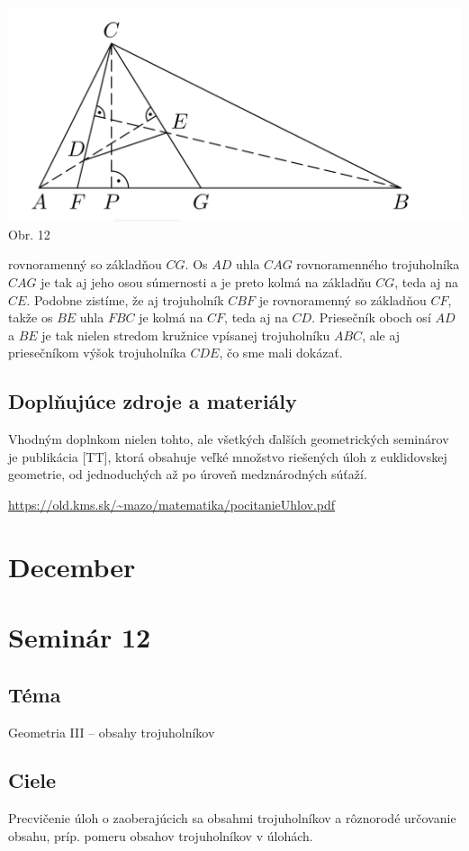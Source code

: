 \documentclass[11pt,a4paper,oneside,final]{book}
\begin{document}
\begin{center}
\includegraphics{58K22}\\

Obr. 12
\end{center}
rovnoramenný so základňou $CG$. Os $AD$ uhla $CAG$ rovnoramenného trojuholníka $CAG$ je tak aj jeho osou súmernosti a je preto kolmá na základňu $CG$, teda aj na $CE$. Podobne zistíme, že aj trojuholník $CBF$ je rovnoramenný so základňou $CF$, takže os $BE$ uhla $FBC$ je kolmá na $CF$, teda aj na $CD$. Priesečník oboch osí $AD$ a $BE$ je tak nielen stredom kružnice vpísanej trojuholníku $ABC$, ale aj priesečníkom výšok trojuholníka $CDE$, čo sme mali dokázať.

\subsection*{Doplňujúce zdroje a materiály}
Vhodným doplnkom nielen tohto, ale všetkých ďalších geometrických seminárov je publikácia [TT], ktorá obsahuje veľké množstvo riešených úloh z euklidovskej geometrie, od jednoduchých až po úroveň medznárodných súťaží.

\url{https://old.kms.sk/~mazo/matematika/pocitanieUhlov.pdf}

\newpage
\section{December}
\section*{Seminár 12}
\subsection*{Téma}
Geometria III -- obsahy trojuholníkov

\subsection*{Ciele}
Precvičenie úloh o zaoberajúcich sa obsahmi trojuholníkov a rôznorodé určovanie obsahu, príp. pomeru obsahov trojuholníkov v úlohách.
\end{document}
